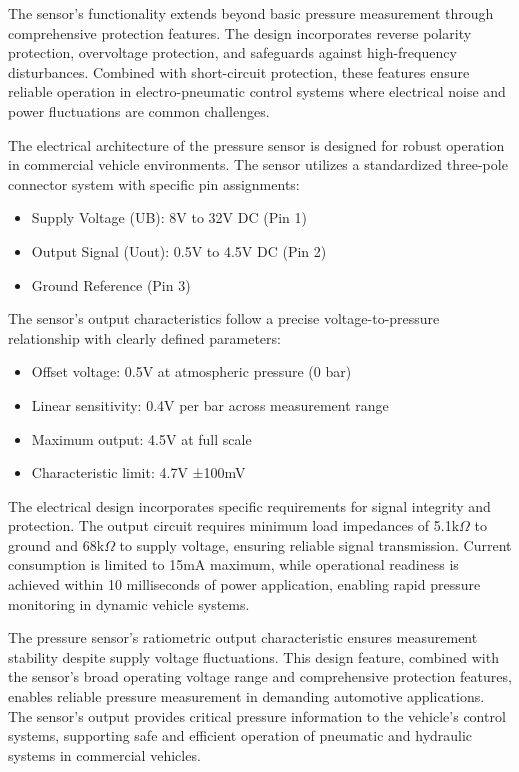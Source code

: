 \documentclass[12pt]{article}
\begin{document}
The sensor's functionality extends beyond basic pressure measurement through
comprehensive protection features. The design incorporates reverse polarity
protection, overvoltage protection, and safeguards against high-frequency
disturbances. Combined with short-circuit protection, these features ensure
reliable operation in electro-pneumatic control systems where electrical noise
and power fluctuations are common challenges.

The electrical architecture of the pressure sensor is designed for robust
operation in commercial vehicle environments. The sensor utilizes a
standardized three-pole connector system with specific pin assignments:

\begin{itemize} \item Supply Voltage (UB): 8V to 32V DC (Pin 1) \item Output
Signal (Uout): 0.5V to 4.5V DC (Pin 2) \item Ground Reference (Pin 3)
\end{itemize}

The sensor's output characteristics follow a precise voltage-to-pressure
relationship with clearly defined parameters:

\begin{itemize} \item Offset voltage: 0.5V at atmospheric pressure (0 bar)
\item Linear sensitivity: 0.4V per bar across measurement range \item Maximum
output: 4.5V at full scale \item Characteristic limit: 4.7V ±100mV
\end{itemize}

The electrical design incorporates specific requirements for signal integrity
and protection. The output circuit requires minimum load impedances of 5.1k$\Omega$
to
ground and 68k$\Omega$ to supply voltage, ensuring reliable signal transmission.
Current consumption is limited to 15mA maximum, while operational readiness is
achieved within 10 milliseconds of power application, enabling rapid pressure
monitoring in dynamic vehicle systems.

The pressure sensor's ratiometric output characteristic ensures measurement
stability despite supply voltage fluctuations. This design feature, combined
with the sensor's broad operating voltage range and comprehensive protection
features, enables reliable pressure measurement in demanding automotive
applications. The sensor's output provides critical pressure information to the
vehicle's control systems, supporting safe and efficient operation of pneumatic
and hydraulic systems in commercial vehicles.
\end{document}
